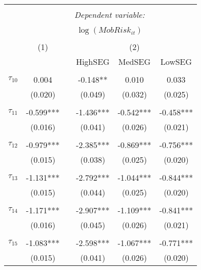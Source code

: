 \begin{tabular}{@{\extracolsep{-5pt}}lccccc} 
\\[-1.8ex]\hline 
\hline \\[-1.8ex] 
 & \multicolumn{5}{c}{\textit{Dependent variable:}} \\ 
\cline{2-6} 
\\[-1.8ex] & \multicolumn{5}{c}{$\log(MobRisk_{it})$}\\ 
\\[-1.8ex] & (1) && \multicolumn{3}{c}{(2)} \\ 
\cline{2-2}\cline{4-6}
        &&& HighSEG & MedSEG & LowSEG  \\
 \\[-1.8ex] 
$\tau_{10}$     &   0.004   && -0.148**  &   0.010   &   0.033   \\
                &  (0.020)  &&  (0.049)  &  (0.032)  &  (0.025)  \\
                &           &&           &           &           \\[-2.1ex]
$\tau_{11}$     & -0.599*** && -1.436*** & -0.542*** & -0.458*** \\
                &  (0.016)  &&  (0.041)  &  (0.026)  &  (0.021)  \\
                &           &&           &           &           \\[-2.1ex]
$\tau_{12}$     & -0.979*** && -2.385*** & -0.869*** & -0.756*** \\
                &  (0.015)  &&  (0.038)  &  (0.025)  &  (0.020)  \\
                &           &&           &           &           \\[-2.1ex]
$\tau_{13}$     & -1.131*** && -2.792*** & -1.044*** & -0.844*** \\
                &  (0.015)  &&  (0.044)  &  (0.025)  &  (0.020)  \\
                &           &&           &           &           \\[-2.1ex]
$\tau_{14}$     & -1.171*** && -2.907*** & -1.109*** & -0.841*** \\
                &  (0.016)  &&  (0.045)  &  (0.026)  &  (0.021)  \\
                &           &&           &           &           \\[-2.1ex]
$\tau_{15}$     & -1.083*** && -2.598*** & -1.067*** & -0.771*** \\
                &  (0.015)  &&  (0.041)  &  (0.026)  &  (0.020)  \\

\end{tabular}
